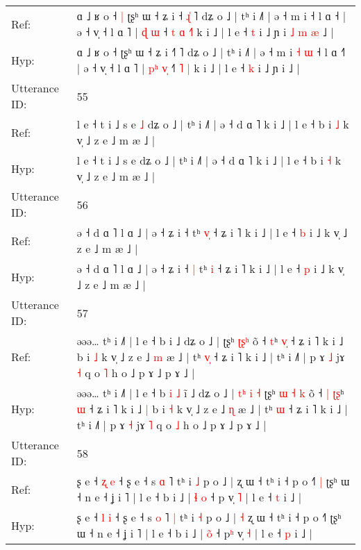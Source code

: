\documentclass[10pt]{article}
\DeclareRobustCommand{\hl}[1]{{\textcolor{red}{#1}}}
\begin{document}
\begin{longtable}{ll}
Ref: & ɑ ˩ ʁ o ˧\hl{ }\hl{|} ʈʂʰ ɯ ˧ ʑ i ˧\hl{ }\hl{ɻ}\hl{̍} ˥ dʑ o ˩ | tʰ i ˩˥ | ə ˧ m i\hl{}\hl{}\hl{}\hl{} ˧ l ɑ ˧\hl{} | ə ˧ v̩ ˧ l ɑ ˥ | \hl{}\hl{ɖ} \hl{}\hl{ɯ} ˧\hl{ }\hl{t} \hl{ɑ} \hl{˧}\hl{˥} k i ˩ | l e ˧ \hl{t} i ˩ ɲ i\hl{ }\hl{˩}\hl{ }\hl{m}\hl{ }\hl{æ} ˩ |
 \\
Hyp: & ɑ ˩ ʁ o ˧\hl{}\hl{} ʈʂʰ ɯ ˧ ʑ i ˧\hl{}\hl{}\hl{˥} ˥ dʑ o ˩ | tʰ i ˩˥ | ə ˧ m i\hl{ }\hl{˧}\hl{ }\hl{ɯ} ˧ l ɑ ˧\hl{˥} | ə ˧ v̩ ˧ l ɑ ˥ | \hl{p}\hl{ʰ} \hl{v}\hl{̩} ˧\hl{}\hl{˥} \hl{˥} \hl{}\hl{|} k i ˩ | l e ˧ \hl{k} i ˩ ɲ i\hl{}\hl{}\hl{}\hl{}\hl{}\hl{} ˩ |
 \\
\midrule
Utterance ID: & 55 \\
Ref: & l e ˧ t i ˩ s e\hl{ }\hl{˩} dʑ o ˩ | tʰ i ˩˥ | ə ˧ d ɑ ˥ k i ˩ | l e ˧ b i \hl{˩} k v̩ ˩ z e ˩ m æ ˩ |
 \\
Hyp: & l e ˧ t i ˩ s e\hl{}\hl{} dʑ o ˩ | tʰ i ˩˥ | ə ˧ d ɑ ˥ k i ˩ | l e ˧ b i \hl{˧} k v̩ ˩ z e ˩ m æ ˩ |
 \\
\midrule
Utterance ID: & 56 \\
Ref: & ə ˧ d ɑ ˥ l ɑ ˩ | ə ˧ ʑ i ˧\hl{}\hl{} tʰ \hl{v}\hl{̩} ˧ ʑ i ˥ k i ˩ | l e ˧ \hl{b} i ˩ k v̩ ˩ z e ˩ m æ ˩ |
 \\
Hyp: & ə ˧ d ɑ ˥ l ɑ ˩ | ə ˧ ʑ i ˧\hl{ }\hl{|} tʰ \hl{}\hl{i} ˧ ʑ i ˥ k i ˩ | l e ˧ \hl{p} i ˩ k v̩ ˩ z e ˩ m æ ˩ |
 \\
\midrule
Utterance ID: & 57 \\
Ref: & əəə… tʰ i ˩˥ | l e ˧ b\hl{}\hl{}\hl{}\hl{} i\hl{} ˩ dʑ o ˩ |\hl{}\hl{}\hl{}\hl{}\hl{}\hl{}\hl{} ʈʂʰ\hl{}\hl{} \hl{ʈ}\hl{ʂ}\hl{ʰ} õ ˧\hl{}\hl{} \hl{}\hl{t}ʰ \hl{v}\hl{̩} ˧ ʑ i ˥ k i ˩\hl{}\hl{} b i \hl{˩} k v̩ ˩ z e ˩ \hl{m} æ ˩ | tʰ \hl{v}\hl{̩} ˧ ʑ i ˥ k i ˩ | tʰ i ˩˥ | p ɤ \hl{˩} jɤ \hl{˧} q o \hl{˥} h o ˩ p ɤ ˩ p ɤ ˩ |
 \\
Hyp: & əəə… tʰ i ˩˥ | l e ˧ b\hl{ }\hl{i}\hl{ }\hl{˩} i\hl{̃} ˩ dʑ o ˩ |\hl{ }\hl{t}\hl{ʰ}\hl{ }\hl{i}\hl{ }\hl{˧} ʈʂʰ\hl{ }\hl{ɯ} \hl{˧}\hl{ }\hl{k} õ ˧\hl{ }\hl{|} \hl{ʈ}\hl{ʂ}ʰ \hl{}\hl{ɯ} ˧ ʑ i ˥ k i ˩\hl{ }\hl{|} b i \hl{˧} k v̩ ˩ z e ˩ \hl{ɳ} æ ˩ | tʰ \hl{}\hl{ɯ} ˧ ʑ i ˥ k i ˩ | tʰ i ˩˥ | p ɤ \hl{˧} jɤ \hl{˥} q o \hl{˩} h o ˩ p ɤ ˩ p ɤ ˩ |
 \\
\midrule
Utterance ID: & 58 \\
Ref: & ʂ e ˧ \hl{ʐ} \hl{e} ˧ ʂ e ˧ s \hl{ɑ} ˥\hl{}\hl{} tʰ i \hl{˩} p o ˩ |\hl{}\hl{} ʐ ɯ ˧ tʰ i ˧ p o ˧˥\hl{ }\hl{|} ʈʂʰ ɯ ˧ n e ˧ ʝ i ˥ | l e ˧ b i ˩ | \hl{ɬ}\hl{ }\hl{o} ˧ p\hl{} v̩ \hl{˥} | l e ˧ \hl{t} i ˩ |
 \\
Hyp: & ʂ e ˧ \hl{l} \hl{i} ˧ ʂ e ˧ s \hl{o} ˥\hl{ }\hl{|} tʰ i \hl{˧} p o ˩ |\hl{ }\hl{˧} ʐ ɯ ˧ tʰ i ˧ p o ˧˥\hl{}\hl{} ʈʂʰ ɯ ˧ n e ˧ ʝ i ˥ | l e ˧ b i ˩ | \hl{}\hl{o}\hl{̃} ˧ p\hl{ʰ} v̩ \hl{˧} | l e ˧ \hl{p} i ˩ |

\end{longtable}
\end{document}

